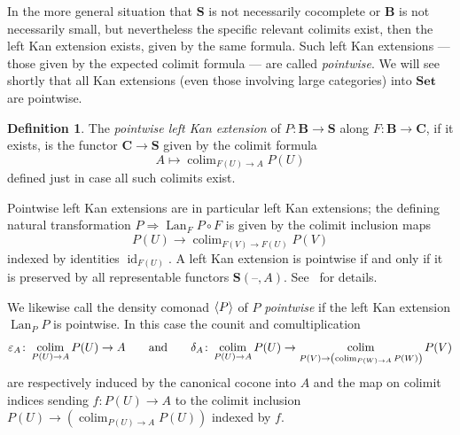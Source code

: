 \documentclass[11pt, oneside, article]{memoir}
\theoremstyle{plain}
\theoremstyle{definition}
\newtheorem{definition}[def]{Definition}
\theoremstyle{remark}
\DeclareMathOperator{\id}{id}
\DeclareMathOperator{\Lan}{Lan}
\DeclareMathOperator*{\colim}{colim}
\DeclarePairedDelimiter{\gen}{\langle}{\rangle}
\newcommand{\dash}{{\mathord{\text{--}}}}
\newcommand{\tn}[1]{\textnormal{#1}}
\newcommand{\namedcat}[1]{\mathbf{#1}}
\newcommand{\cat}[1]{\mathbf{#1}}
\newcommand{\Set}{\namedcat{Set}}
\newcommand{\ph}[1]{#1}
\newcommand{\Ho}[1]{#1}
\newcommand{\xA}{A}
\newcommand{\xU}{U}
\newcommand{\xV}{V}
\newcommand{\xW}{W}
\newcommand{\bB}{\cat{B}}
\newcommand{\bC}{\cat{C}}
\newcommand{\bS}{\cat{S}}
\newcommand{\pP}{\ph{P}}
\newcommand{\cP}{\gen{\pP}}
\newcommand{\La}[2]{\Lan_{#1}#2}
\newcommand{\hh}[2][]{#1 \tn{#2} #1}
\newcommand{\qqand}{\hh[\qquad]{and}}
\begin{document}
In the more general situation that $\bS$ is not necessarily cocomplete
or $\bB$ is not necessarily small, but nevertheless the specific
relevant colimits exist, then the left Kan extension exists, given by
the same formula. Such left Kan extensions --- those given by the
expected colimit formula --- are called \emph{pointwise}.  We will see
shortly that all Kan extensions (even those involving large
categories) into $\Set$ are pointwise.

\begin{definition}\label{def:pointwise}
  The \emph{pointwise left Kan extension} of $\pP \colon \bB \to \bS$
  along $F \colon \bB \to \bC$, if it exists, is the functor
  $\bC \to \bS$ given by the colimit formula
  \[\xA \mapsto \colim_{F(\xU) \to \xA} \pP(\xU)\] defined just in case all
  such colimits exist.

  Pointwise left Kan extensions are in particular left Kan extensions;
  the defining natural transformation
  $\pP \Rightarrow \La{F}{\pP} \circ F$ is given by the colimit
  inclusion maps \[\pP(\xU) \to \colim_{F(\xV) \to F(\xU)} \pP(\xV)\]
  indexed by identities $\id_{F(\xU)}$. A left Kan extension is
  pointwise if and only if it is preserved by all representable
  functors $\Ho{\bS}(\dash, \xA)$. See~\cite[Theorem X.5.3]{maclane}
  for details.

  We likewise call the density comonad $\cP$ of $P$ \emph{pointwise}
  if the left Kan extension $\La{\pP}{\pP}$ is pointwise.
  In this case the counit and comultiplication
  \[\varepsilon_\xA \colon \colim_{\pP(\xU) \to \xA} \pP(\xU) \to \xA
    \qqand \delta_\xA \colon \colim_{\pP(\xU) \to \xA} \pP(\xU) \to
    \colim_{\pP(\xV) \to \left(\colim_{\pP(\xW) \to \xA}
        \pP(\xW)\right)} \pP(\xV)\] are respectively induced by the
  canonical cocone into $\xA$ and the map on colimit indices sending
  $f \colon \pP(\xU) \to \xA$ to the colimit inclusion
  $\pP(\xU) \to \left(\colim_{\pP(\xU) \to \xA} \pP(\xU)\right)$
  indexed by $f$.
\end{definition}

\end{document}
